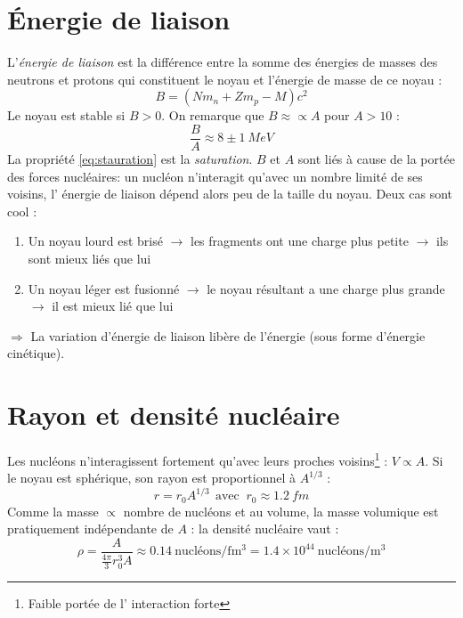 \documentclass	[11pt, a4paper, openany]{book}
\begin{document}
		\section{Énergie de liaison}
		L'\textit{énergie de liaison} est la différence entre la somme des énergies de masses des neutrons 
		et protons qui constituent le noyau et l'énergie de masse de ce noyau : 
		\begin{equation}
			B = (Nm_n + Zm_p - M)c^2
		\end{equation}
		Le noyau est stable si $B>0$. On remarque que $B \approx\propto A$ pour $A>10$ :
		\begin{equation}
			\frac{B}{A} \approx 8 \pm 1\ MeV
			\label{eq:stauration}
		\end{equation}
		La propriété \autoref{eq:stauration} est la \textit{saturation}. $B$ et $A$ sont liés à cause de la 
		portée des forces nucléaires: un nucléon n’interagit qu'avec un nombre limité de ses voisins, l'
		énergie de liaison dépend alors peu de la taille du noyau. Deux cas sont cool :
		\begin{enumerate}
			\item Un noyau lourd est brisé $\rightarrow$ les fragments ont une charge plus petite $\rightarrow$ ils
			      sont mieux liés que lui
			\item Un noyau léger est fusionné $\rightarrow$ le noyau résultant a une charge plus grande$\rightarrow$
			      il est mieux lié que lui
		\end{enumerate}
		$\Rightarrow$ La variation d'énergie de liaison libère de l'énergie (sous forme d'énergie cinétique).
		
		
		\section{Rayon et densité nucléaire}
		Les nucléons n'interagissent fortement qu'avec leurs proches voisins\footnote{Faible portée de l'
			interaction forte} : $V \propto A$. Si le noyau est sphérique, son rayon est proportionnel à $A^{
		1/3}$ :
		\begin{equation}
			r = r_0A^{1/3}\ \ \text{avec }\ r_0 \approx 1.2\ fm
		\end{equation}
		Comme la masse $\propto$ nombre de nucléons et au volume, la masse volumique est pratiquement indépendante
		de $A$ : la densité nucléaire vaut : 
		\begin{equation}
			\rho = \frac{A}{\frac{4\pi}{3}r_0^3A}\approx 0.14\ \text{nucléons/fm$^3$} = 1.4\times
			10^{44}\ \text{nucléons/m$^3$}
		\end{equation}
		
\end{document}
